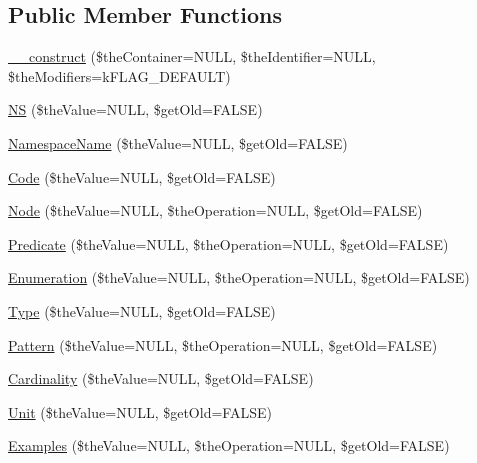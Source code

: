 \subsection*{Public Member Functions}
\begin{DoxyCompactItemize}
\item 
\hyperlink{class_c_ontology_term_a33679101b2a63044f0084918a8df123e}{\-\_\-\-\_\-construct} (\$the\-Container=N\-U\-L\-L, \$the\-Identifier=N\-U\-L\-L, \$the\-Modifiers=k\-F\-L\-A\-G\-\_\-\-D\-E\-F\-A\-U\-L\-T)
\item 
\hyperlink{class_c_ontology_term_ab55c1e6f6783ab0e8507b951d62706bd}{N\-S} (\$the\-Value=N\-U\-L\-L, \$get\-Old=F\-A\-L\-S\-E)
\item 
\hyperlink{class_c_ontology_term_a0c918f74342b3a93a3b651198c779773}{Namespace\-Name} (\$the\-Value=N\-U\-L\-L, \$get\-Old=F\-A\-L\-S\-E)
\item 
\hyperlink{class_c_ontology_term_ac5eff0c56ad6a31c732984295821c814}{Code} (\$the\-Value=N\-U\-L\-L, \$get\-Old=F\-A\-L\-S\-E)
\item 
\hyperlink{class_c_ontology_term_a86fd6d9e2c98a68c1600975f18793239}{Node} (\$the\-Value=N\-U\-L\-L, \$the\-Operation=N\-U\-L\-L, \$get\-Old=F\-A\-L\-S\-E)
\item 
\hyperlink{class_c_ontology_term_aa275beb37c6697a8b9a6a6685f829afb}{Predicate} (\$the\-Value=N\-U\-L\-L, \$the\-Operation=N\-U\-L\-L, \$get\-Old=F\-A\-L\-S\-E)
\item 
\hyperlink{class_c_ontology_term_acbffa05d49c87a82d4ff71e93d3e732c}{Enumeration} (\$the\-Value=N\-U\-L\-L, \$the\-Operation=N\-U\-L\-L, \$get\-Old=F\-A\-L\-S\-E)
\item 
\hyperlink{class_c_ontology_term_afd46ef8241b696e99cf7b5e1334914b7}{Type} (\$the\-Value=N\-U\-L\-L, \$get\-Old=F\-A\-L\-S\-E)
\item 
\hyperlink{class_c_ontology_term_a6cf8cb14d45aae044d61ce8cab211d92}{Pattern} (\$the\-Value=N\-U\-L\-L, \$the\-Operation=N\-U\-L\-L, \$get\-Old=F\-A\-L\-S\-E)
\item 
\hyperlink{class_c_ontology_term_a0115abc39300d18a7d35014850d18a2e}{Cardinality} (\$the\-Value=N\-U\-L\-L, \$get\-Old=F\-A\-L\-S\-E)
\item 
\hyperlink{class_c_ontology_term_a81d71459e7696a821bdacaae7166483f}{Unit} (\$the\-Value=N\-U\-L\-L, \$get\-Old=F\-A\-L\-S\-E)
\item 
\hyperlink{class_c_ontology_term_a88a9743b98281665517ef3d5c16bed4c}{Examples} (\$the\-Value=N\-U\-L\-L, \$the\-Operation=N\-U\-L\-L, \$get\-Old=F\-A\-L\-S\-E)

\end{DoxyCompactItemize}
